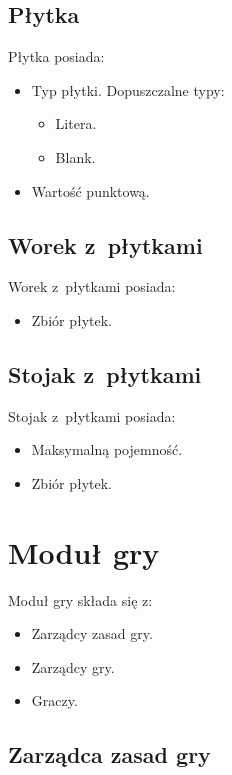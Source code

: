 \documentclass[a4paper,10pt]{report}
\begin{document}
\subsection{Płytka}

Płytka posiada:

\begin{itemize}
 \item Typ płytki. Dopuszczalne typy:
	\begin{itemize}
		\item Litera.
		\item Blank.
	\end{itemize}
 \item Wartość punktową.
\end{itemize}

\subsection{Worek z~płytkami}

Worek z~płytkami posiada:

\begin{itemize}
 \item Zbiór płytek.
\end{itemize}

\subsection{Stojak z~płytkami}

Stojak z~płytkami posiada:

\begin{itemize}
 \item Maksymalną pojemność.
 \item Zbiór płytek.
\end{itemize}

\section{Moduł gry}

Moduł gry składa się z:

\begin{itemize}
 \item Zarządcy zasad gry.
 \item Zarządcy gry.
 \item Graczy.
\end{itemize}

\subsection{Zarządca zasad gry}
\end{document}
